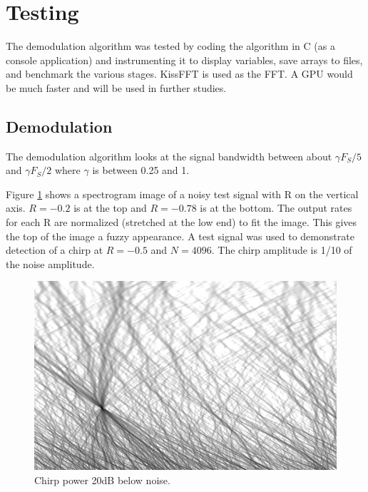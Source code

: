 \section{Testing}

The demodulation algorithm was tested by coding the algorithm in C (as a console
application) and instrumenting it to display variables,
save arrays to files, and benchmark the various stages.
KissFFT is used as the FFT. A GPU would be much faster and will be used in further studies.

\subsection{Demodulation}

The demodulation algorithm looks at the signal bandwidth between about
$\gamma F_S/5$ and $\gamma F_S/2$ where $\gamma$ is between 0.25 and 1.

Figure \ref{fig:chirpTest1} shows a spectrogram image of a noisy test signal with R on the vertical axis.
$R=-0.2$ is at the top and $R=-0.78$ is at the bottom.
The output rates for each R are normalized (stretched at the low end) to fit the image.
This gives the top of the image a fuzzy appearance.
A test signal was used to demonstrate detection of a chirp at $R=-0.5$ and $N=4096$.
The chirp amplitude is 1/10 of the noise amplitude.
\begin{figure}
  \includegraphics[width=\linewidth]{../source/chirp42m.jpg}
  \caption{Chirp power 20dB below noise.}
  \label{fig:chirpTest1}
\end{figure}

